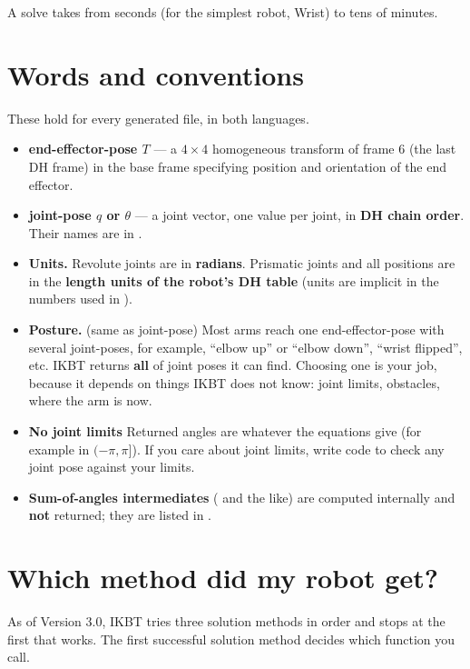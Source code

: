 \documentclass[11pt]{article}
\begin{document}
A solve takes from seconds (for the simplest robot, Wrist) to tens of minutes.


\section{Words and conventions}

These hold for every generated file, in both languages.

\begin{itemize}
\item \textbf{end-effector-pose $T$} ---   a $4\times4$
  homogeneous transform of frame 6 (the last DH frame) in the base frame
  specifying position and orientation of the end effector.
\item \textbf{joint-pose $q$ or $\theta$} --- a joint vector, one value per joint, in
  \textbf{DH chain order}.  Their names are in  .
\item \textbf{Units.}  Revolute joints are in \textbf{radians}.  Prismatic joints
  and all positions are in the \textbf{length units of the robot's DH table}
  (units are implicit in the numbers used in  ).
\item \textbf{Posture.}  (same as joint-pose)
Most arms reach one end-effector-pose with several
  joint-poses, for example, ``elbow up'' or ``elbow down'', ``wrist flipped'', etc.
  IKBT returns \textbf{all} of
  joint poses it can find.  Choosing one is your job, because it depends on things IKBT
  does not know:  joint limits, obstacles, where the arm is now.
\item \textbf{No joint limits}  Returned angles are whatever
  the equations give (for example in $(-\pi, \pi]$).  If you care about joint limits,
  write code to check any joint pose against your limits.
\item \textbf{Sum-of-angles intermediates} ( and the like) are
  computed internally and \textbf{not} returned;  they are listed in
  .
\end{itemize}

\section{Which method did my robot get?}\label{sec:method}

As of Version 3.0,
IKBT tries three solution methods in order and stops at the first that works.
The first successful solution method decides which function you
call.
\end{document}
